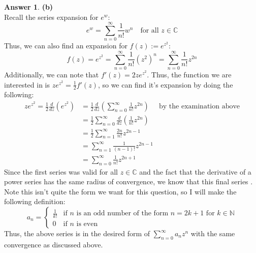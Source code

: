 \documentclass[10pt,a4paper]{article}
\theoremstyle{definition}
\newtheorem*{answer*}{Answer}
\begin{document}
\begin{answer*}{\textbf{(b)}}
\\Recall the series expansion for $e^w$:
\[e^w = \sum_{n = 0}^{\infty} \frac{1}{n!}w^n \quad \text{for all $z \in \mathbb{C}$}\]
Thus, we can also find an expansion for $f(z) := e^{z^2}$:
\[f(z) = e^{z^2} = \sum_{n = 0}^{\infty} \frac{1}{n!}(z^2)^n = \sum_{n = 0}^{\infty} \frac{1}{n!}z^{2n}\]
Additionally, we can note that $f'(z) = 2ze^{z^2}$. Thus, the function we are interested in is $ze^{z^2} = \frac{1}{2}f'(z)$, so we can find it's expansion by doing the following:
\begin{align*}
ze^{z^2} = \frac{1}{2} \frac{d}{dz}\left(e^{z^2}\right) &= \frac{1}{2} \frac{d}{dz}\left(\sum_{n = 0}^{\infty} \frac{1}{n!}z^{2n}\right) &\text{by the examination above}\\
&= \frac{1}{2} \sum_{n = 0}^{\infty} \frac{d}{dz}\left(\frac{1}{n!}z^{2n}\right)\\
&= \frac{1}{2}\sum_{n = 1}^{\infty} \frac{2n}{n!}z^{2n - 1}\\
&= \sum_{n = 1}^{\infty} \frac{1}{(n - 1)!}z^{2n - 1}\\
&= \sum_{n =0}^{\infty} \frac{1}{n!}z^{2n + 1}
\end{align*}
Since the first series was valid for all $z \in \mathbb{C}$ and the fact that the derivative of a power series has the same radius of convergence, we know that this final series . Note this isn't quite the form we want for this question, so I will make the following definition:
\[
a_n = \begin{cases}
\frac{1}{k!} &\text{if $n$ is an odd number of the form $n = 2k + 1$ for $k \in \mathbb{N}$}\\
0 &\text{if $n$ is even}
\end{cases}
\]
Thus, the above series is in the desired form of $\displaystyle \sum_{n = 0}^{\infty} a_nz^n$ with the same convergence as discussed above. 
\end{answer*}
\end{document}
